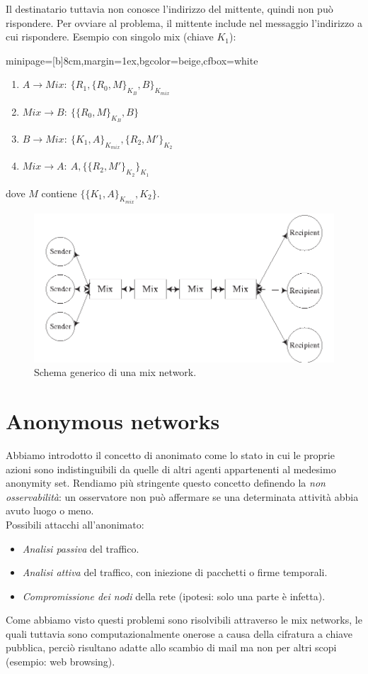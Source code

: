 \documentclass[a4paper, 11pt, notitlepage, fleqn]{report}
\newcommand{\fromto}[2]{#1\rightarrow #2\!:\ }
\newenvironment{colbox}[2]%
{%
	\par\noindent\hspace{10pt}
	\begin{adjustbox}{minipage=[b]{#2},margin=1ex,bgcolor=#1,cfbox=white}
}{%
	\end{adjustbox}\newline%
}
\begin{document}
Il destinatario tuttavia non conosce l'indirizzo del mittente, quindi non può rispondere. Per ovviare al problema, il mittente include nel messaggio l'indirizzo a cui rispondere. Esempio con singolo mix (chiave $K_1$):
\begin{colbox}{beige}{8cm}
	\begin{enumerate}
		\item $\fromto{A}{Mix}\{ R_1, \{R_0, M\}_{K_B}, B\}_{K_{mix}}$
		\item $\fromto{Mix}{B}\{\{R_0, M\}_{K_B}, B\}$
		\item $\fromto{B}{Mix}\{K_1, A\}_{K_{mix}}, \{R_2, M'\}_{K_2}$
		\item $\fromto{Mix}{A}A,\{\{R_2, M'\}_{K_2}\}_{K_1}$
	\end{enumerate}
\end{colbox}
dove $M$ contiene $\{\{K_1, A\}_{K_{mix}}, K_2\}$.

\begin{figure}[htp]
	\centering
	\includegraphics[width=\textwidth]{images/MixNetwork}
	\caption{Schema generico di una mix network.}
\end{figure}

\section{Anonymous networks}
Abbiamo introdotto il concetto di anonimato come lo stato in cui le proprie azioni sono indistinguibili da quelle di altri agenti appartenenti al medesimo anonymity set. Rendiamo più stringente questo concetto definendo la \emph{non osservabilità}: un osservatore non può affermare se una determinata attività abbia avuto luogo o meno.\\
Possibili attacchi all'anonimato:
\begin{itemize}
	\item \emph{Analisi passiva} del traffico.
	\item \emph{Analisi attiva} del traffico, con iniezione di pacchetti o firme temporali.
	\item \emph{Compromissione dei nodi} della rete (ipotesi: solo una parte è infetta).
\end{itemize}
Come abbiamo visto questi problemi sono risolvibili attraverso le mix networks, le quali tuttavia sono computazionalmente onerose a causa della cifratura a chiave pubblica, perciò risultano adatte allo scambio di mail ma non per altri scopi (esempio: web browsing).
\end{document}
